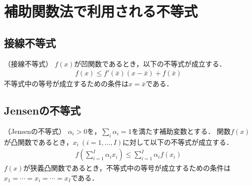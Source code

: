\chapter{補助関数法で利用される不等式}
\label{chap:ineq}

\section{接線不等式}

\begin{lemm} \label{lem:aux:sessen} （接線不等式）
  $f(x)$が凹関数であるとき，以下の不等式が成立する．
  \begin{align}
    f(x) \leq f'(\bar{x}) (x - \bar{x}) + f(\bar{x})
  \end{align}
  不等式中の等号が成立するための条件は$x = \bar{x}$である．
\end{lemm}

\section{Jensenの不等式}

\begin{lemm} \label{lem:aux:jensen} （Jensenの不等式）
$\alpha_{i} > 0$を，$\sum_{i} \alpha_{i} = 1$を満たす補助変数とする．
関数$f(x)$が凸関数であるとき，$x_{i}\ (i = 1,\ldots,I)$に対して以下の不等式が成立する．
\begin{align}
  f \left( \sum_{i=1}^{I} \alpha_{i} x_{i} \right) \leq \sum_{i=1}^{I} \alpha_{i} f(x_{i})
\end{align}
$f(x)$が狭義凸関数であるとき，不等式中の等号が成立するための条件は
$x_1 = \cdots = x_i = \cdots = x_I$である．
\end{lemm}
